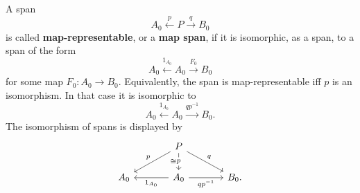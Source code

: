 \begin{definition}
\label{def:representable-span}
    A span
    \[
        A_0\xleftarrow{p}P\xrightarrow{q}B_0
    \]
    is called \textbf{map-representable}, or a \textbf{map span}, if it is isomorphic, as a span, to a span of the form
    \[
        A_0
        \xleftarrow{1_{A_0}}
        A_0
        \xrightarrow{F_0}
        B_0
    \]
    for some map \(F_0:A_0\to B_0\). Equivalently, the span is map-representable iff \(p\) is an isomorphism. In that case it is isomorphic to
    \[
        A_0\xleftarrow{1_{A_0}}A_0\xrightarrow{q p^{-1}}B_0.
    \]
    The isomorphism of spans is displayed by
    \[
        \begin{tikzcd}[column sep=large]
            & 
                P 
                    \arrow[d, "p" description, "\cong"'] 
                    \arrow[dl, "p"'] 
                    \arrow[dr, "q"] 
            & 
            \\
                A_0 
            & 
                A_0 
                    \arrow[l, "1_{A_0}"] 
                    \arrow[r, "qp^{-1}"'] 
            & 
                B_0.
        \end{tikzcd}
    \]
\end{definition}

